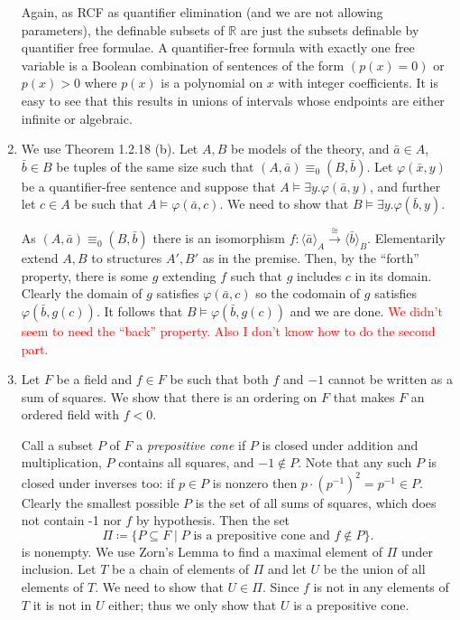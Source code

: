 \documentclass{article}
\theoremstyle{theorem}
\begin{document}
\begin{enumerate}[leftmargin=*]
		Again, as RCF as quantifier elimination (and we are not allowing parameters), the definable subsets of $\mathbb{R}$ are just the subsets definable by quantifier free formulae. A quantifier-free formula with exactly one free variable is a Boolean combination of sentences of the form $(p(x) = 0)$ or $p(x) > 0$ where $p(x)$ is a polynomial on $x$ with integer coefficients. It is easy to see that this results in unions of intervals whose endpoints are either infinite or algebraic.
		\item We use Theorem 1.2.18 (b). Let $A,B$ be models of the theory, and $\bar{a}\in A$, $\bar{b}\in B$ be tuples of the same size such that $(A,\bar{a})\equiv_0 (B,\bar{b})$. Let $\varphi(\bar{x},y)$ be a quantifier-free sentence and suppose that $A\models \exists y. \varphi(\bar{a},y)$, and further let $c\in A$ be such that $A\models \varphi(\bar{a},c)$. We need to show that $B\models \exists y. \varphi(\bar{b},y)$.
		
		As $(A,\bar{a})\equiv_0 (B,\bar{b})$ there is an isomorphism $f\colon \langle \bar{a}\rangle_A \stackrel{\cong}{\to} \langle \bar{b}\rangle_B$. Elementarily extend $A,B$ to structures $A',B'$ as in the premise. Then, by the ``forth'' property, there is some $g$ extending $f$ such that $g$ includes $c$ in its domain. Clearly the domain of $g$ satisfies $\varphi(\bar{a},c)$ so the codomain of $g$ satisfies $\varphi(\bar{b},g(c))$. It follows that $B\models \varphi(\bar{b},g(c))$ and we are done. \textcolor{red}{We didn't seem to need the ``back'' property. Also I don't know how to do the second part.}
		\item Let $F$ be a field and $f\in F$ be such that both $f$ and $-1$ cannot be written as a sum of squares. We show that there is an ordering on $F$ that makes $F$ an ordered field with $f<0$.
		
		Call a subset $P$ of $F$ a \emph{prepositive cone} if $P$ is closed under addition and multiplication, $P$ contains all squares, and $-1\notin P$. Note that any such $P$ is closed under inverses too: if $p\in P$ is nonzero then $p\cdot (p^{-1})^2 = p^{-1}\in P$. Clearly the smallest possible $P$ is the set of all sums of squares, which does not contain -1 nor $f$ by hypothesis. Then the set
		\[
			\Pi \coloneqq \{P\subseteq F\mid P \text{ is a prepositive cone and }f\notin P\}.
		\]	
		is nonempty. We use Zorn's Lemma to find a maximal element of $\Pi$ under inclusion. Let $T$ be a chain of elements of $\Pi$ and let $U$ be the union of all elements of $T$. We need to show that $U\in \Pi$. Since $f$ is not in any elements of $T$ it is not in $U$ either; thus we only show that $U$ is a prepositive cone.
		

\end{enumerate}
\end{document}
